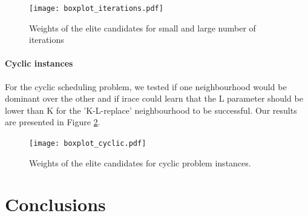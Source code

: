 \documentclass[]{article}
\begin{document}
\begin{figure}
	\texttt{[image: boxplot\_iterations.pdf]}
	\caption{Weights of the elite candidates for small and large number of iterations}
	\label{fig:iterations}
\end{figure}

\paragraph{Cyclic instances}
For the cyclic scheduling problem, we tested if one neighbourhood would be dominant over the other and if irace could learn that the L parameter should be lower than K for the 'K-L-replace' neighbourhood to be successful. Our results are presented in Figure \ref{fig:cyclic}.
\begin{figure}
	\texttt{[image: boxplot\_cyclic.pdf]}
	\caption{Weights of the elite candidates for cyclic problem instances.}
	\label{fig:cyclic}
\end{figure}



\section{Conclusions}




\end{document}
